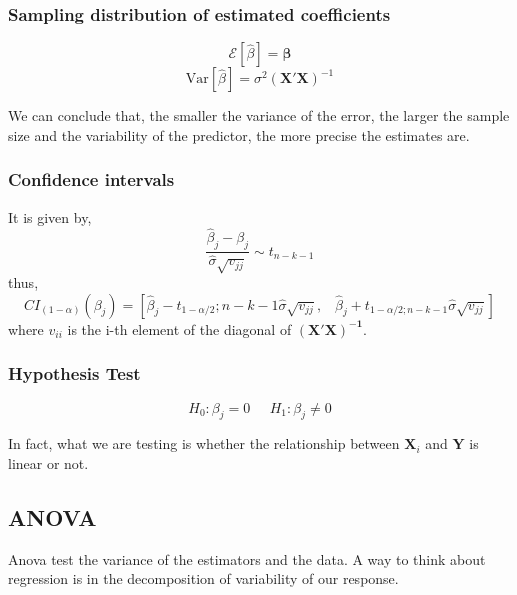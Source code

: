 \subsubsection{Sampling distribution of estimated coefficients}
\begin{equation}
    \mathcal{E}[\hat{\beta}] = \bm{\beta}
\end{equation}
\begin{equation}
    \text{Var}[\hat{\beta}] = \sigma^2 (\bm{X'X})^{-1}
\end{equation}

We can conclude that, the smaller the variance of the error, the larger the
sample size and the variability of the predictor, the more precise the estimates
are.

\subsubsection{Confidence intervals}
It is given by,
\begin{equation}
    \frac{\hat{\beta}_{j}-\beta_{j}}{\hat{\sigma} \sqrt{v_{j j}}} \sim t_{n-k-1}
\end{equation}
thus,
\begin{equation}
    CI_{(1-\alpha)}\left(\beta_{j}\right)=\left[\hat{\beta}_{j}-t_{1-\alpha / 2} ; n-k-1 \hat{\sigma} \sqrt{v_{j j}},\;\;\;
     \hat{\beta}_{j}+t_{1-\alpha / 2 ; n-k-1} \hat{\sigma} \sqrt{v_{j j}}\right]
\end{equation}
where $v_{ii}$ is the i-th element of the diagonal of $\bm{(X'X)^{-1}}$.

\subsubsection{Hypothesis Test}
\begin{equation}
    H_0: \beta_j = 0 \;\;\;\;\; H_1: \beta_j \neq 0
\end{equation}

In fact, what we are testing is whether the relationship between $\bm{X}_i$ and
$\bm{Y}$ is linear or not.

\subsection{ANOVA}
Anova test the variance of the estimators and the data. A way to think about
regression is in the decomposition of variability of our response.

